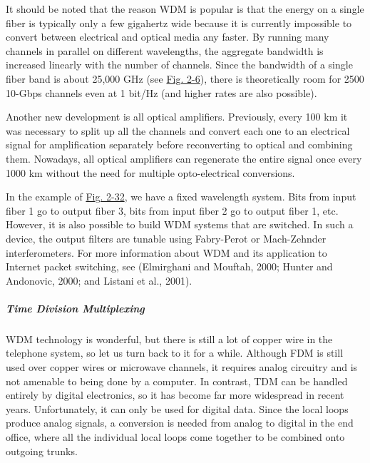 It should be noted that the reason WDM is popular is that the energy on
a single fiber is typically only a few gigahertz wide because it is
currently impossible to convert between electrical and optical media any
faster. By running many channels in parallel on different wavelengths,
the aggregate bandwidth is increased linearly with the number of
channels. Since the bandwidth of a single fiber band is about 25,000 GHz
(see
\protect\hyperlink{0130661023_ch02lev1sec2.htmlux5cux23ch02fig06}{Fig.
2-6}), there is theoretically room for 2500 10-Gbps channels even at 1
bit/Hz (and higher rates are also possible).

Another new development is all optical amplifiers. Previously, every 100
km it was necessary to split up all the channels and convert each one to
an electrical signal for amplification separately before reconverting to
optical and combining them. Nowadays, all optical amplifiers can
regenerate the entire signal once every 1000 km without the need for
multiple opto-electrical conversions.

In the example of
\protect\hyperlink{0130661023_ch02lev1sec5.htmlux5cux23ch02fig32}{Fig.
2-32}, we have a fixed wavelength system. Bits from input fiber 1 go to
output fiber 3, bits from input fiber 2 go to output fiber 1, etc.
However, it is also possible to build WDM systems that are switched. In
such a device, the output filters are tunable using Fabry-Perot or
Mach-Zehnder interferometers. For more information about WDM and its
application to Internet packet switching, see (Elmirghani and Mouftah,
2000; Hunter and Andonovic, 2000; and Listani et al., 2001).

\protect\hypertarget{0130661023_ch02lev1sec5.htmlux5cux23ch02lev3sec14}{}{}

\subparagraph{Time Division Multiplexing}

WDM technology is wonderful, but there is still a lot of copper wire in
the telephone system, so let us turn back to it for a while. Although
FDM is still used over copper wires or microwave channels, it requires
analog circuitry and is not amenable to being done by a computer. In
contrast, TDM can be handled entirely by digital electronics, so it has
become far more widespread in recent years. Unfortunately, it can only
be used for digital data. Since the local loops produce analog signals,
a conversion is needed from analog to digital in the end office, where
all the individual local loops come together to be combined onto
outgoing trunks.

